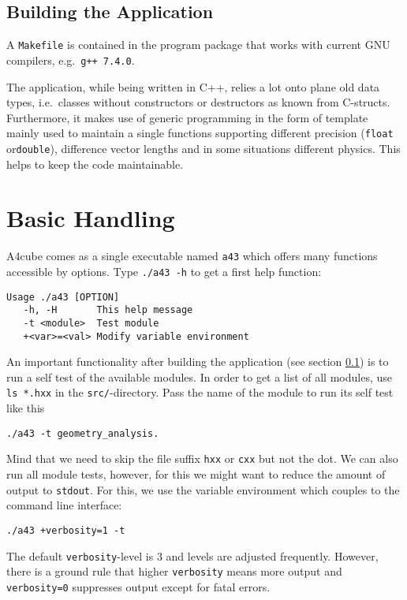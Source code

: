 \documentclass[oribibl]{llncs}
\newcommand{\ttt}[1]{\texttt{#1}}
\newcommand{\codename}{A4cube}
\begin{document}
\subsection{Building the Application} \label{sec:compiling}
A \ttt{Makefile} is contained in the program package that works with current GNU compilers, e.g.~\ttt{g++ 7.4.0}.

The application, while being written in C++, relies a lot onto plane old data types, i.e.~classes without constructors or destructors as known from C-structs.
Furthermore, it makes use of generic programming in the form of template
mainly used to maintain a single functions supporting different precision (\ttt{float} or\ttt{double}), difference vector lengths and in some situations different physics. This helps to keep the code maintainable.

\section{Basic Handling}
\codename{} comes as a single executable named \ttt{a43} which
offers many functions accessible by options. Type \ttt{./a43 -h}
to get a first help function:
\begin{verbatim}
Usage ./a43 [OPTION]
   -h, -H       This help message
   -t <module>  Test module
   +<var>=<val> Modify variable environment
\end{verbatim}

An important functionality after building the application (see section \ref{sec:compiling}) is to run a self test of the available modules.
In order to get a list of all modules, 
use \ttt{ls *.hxx} in the \ttt{src/}-directory.
Pass the name of the module to run its self test like this
\begin{verbatim}
./a43 -t geometry_analysis.
\end{verbatim}
Mind that we need to skip the file suffix \ttt{hxx} or \ttt{cxx} but not the dot.
We can also run all module tests, however, for this we might want to reduce
the amount of output to \ttt{stdout}. For this, we use the variable environment
which couples to the command line interface:
\begin{verbatim}
./a43 +verbosity=1 -t
\end{verbatim}
The default \ttt{verbosity}-level is $3$ and levels are adjusted frequently.
However, there is a ground rule that higher \ttt{verbosity} means more output
and \ttt{verbosity=0} suppresses output except for fatal errors.
\end{document}
